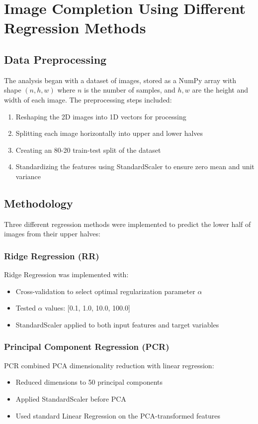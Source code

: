 \section{Image Completion Using Different Regression Methods}

\subsection{Data Preprocessing}
The analysis began with a dataset of images, stored as a NumPy array with shape $(n, h, w)$ where $n$ is the number of samples, and $h, w$ are the height and width of each image. The preprocessing steps included:

\begin{enumerate}
    \item Reshaping the 2D images into 1D vectors for processing
    \item Splitting each image horizontally into upper and lower halves
    \item Creating an 80-20 train-test split of the dataset
    \item Standardizing the features using StandardScaler to ensure zero mean and unit variance
\end{enumerate}

\subsection{Methodology}
Three different regression methods were implemented to predict the lower half of images from their upper halves:

\subsubsection{Ridge Regression (RR)}
Ridge Regression was implemented with:
\begin{itemize}
    \item Cross-validation to select optimal regularization parameter $\alpha$
    \item Tested $\alpha$ values: [0.1, 1.0, 10.0, 100.0]
    \item StandardScaler applied to both input features and target variables
\end{itemize}

\subsubsection{Principal Component Regression (PCR)}
PCR combined PCA dimensionality reduction with linear regression:
\begin{itemize}
    \item Reduced dimensions to 50 principal components
    \item Applied StandardScaler before PCA
    \item Used standard Linear Regression on the PCA-transformed features
\end{itemize}

